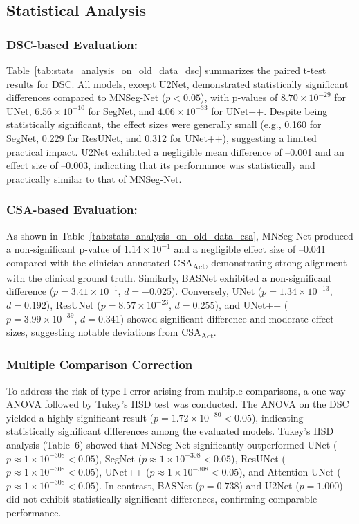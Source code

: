 \subsection{Statistical Analysis}
\subsubsection{DSC-based Evaluation:}
Table~\ref{tab:stats_analysis_on_old_data_dsc} summarizes the paired t-test results for DSC. All models, except U2Net, demonstrated statistically significant differences compared to MNSeg-Net (\(p < 0.05\)), with p-values of \(8.70 \times 10^{-29}\) for UNet, \(6.56 \times 10^{-10}\) for SegNet, and \(4.06 \times 10^{-33}\) for UNet++. Despite being statistically significant, the effect sizes were generally small (e.g., 0.160 for SegNet, 0.229 for ResUNet, and 0.312 for UNet++), suggesting a limited practical impact. U2Net exhibited a negligible mean difference of –0.001 and an effect size of –0.003, indicating that its performance was statistically and practically similar to that of MNSeg-Net.

\subsubsection{CSA-based Evaluation:}
As shown in Table~\ref{tab:stats_analysis_on_old_data_csa}, MNSeg-Net produced a non-significant p-value of \(1.14 \times 10^{-1}\) and a negligible effect size of –0.041 compared with the clinician-annotated CSA\textsubscript{Act}, demonstrating strong alignment with the clinical ground truth. Similarly, BASNet exhibited a non-significant difference (\(p = 3.41 \times 10^{-1}\), \(d = -0.025\)). Conversely, UNet (\(p = 1.34 \times 10^{-13}\), \(d = 0.192\)), ResUNet (\(p = 8.57 \times 10^{-23}\), \(d = 0.255\)), and UNet++ (\(p = 3.99 \times 10^{-39}\), \(d = 0.341\)) showed significant difference and moderate effect sizes, suggesting notable deviations from CSA\textsubscript{Act}.



\subsubsection{Multiple Comparison Correction}\label{multiple_comparison_correction} 

To address the risk of type I error arising from multiple comparisons, a one-way ANOVA followed by Tukey’s HSD test was conducted. The ANOVA on the DSC yielded a highly significant result (\(p = 1.72 \times 10^{-80} < 0.05\)), indicating statistically significant differences among the evaluated models. Tukey’s HSD analysis (Table~6) showed that MNSeg-Net significantly outperformed UNet ($p \approx 1 \times 10^{-308} < 0.05$), SegNet ($p \approx 1 \times 10^{-308} < 0.05$), ResUNet ($p \approx 1 \times 10^{-308} < 0.05$), UNet++ ($p \approx 1 \times 10^{-308} < 0.05$), and Attention-UNet ($p \approx 1 \times 10^{-308} < 0.05$). In contrast, BASNet (\(p = 0.738\)) and U2Net (\(p = 1.000\)) did not exhibit statistically significant differences, confirming comparable performance.

